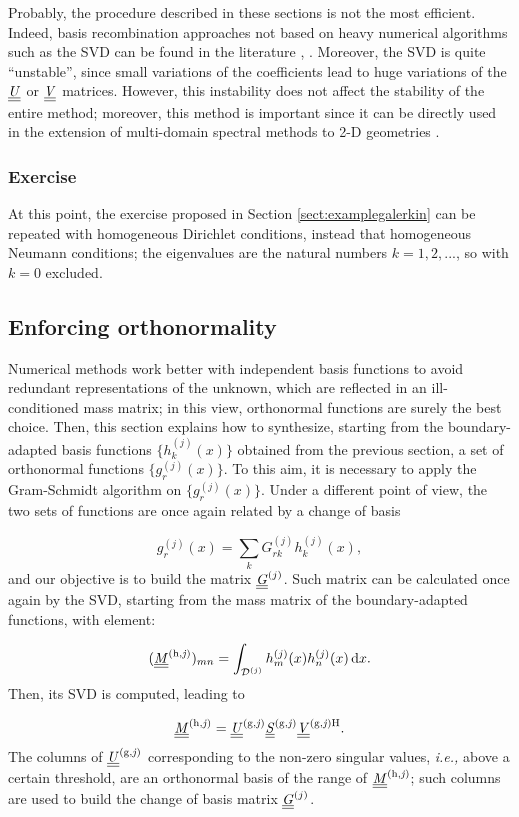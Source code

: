 \documentclass[a4paper,12pt]{article}
\begin{document}
Probably, the procedure described in these sections is not the most efficient. Indeed, basis recombination approaches not based on heavy numerical algorithms such as the SVD can be found in the literature \cite{morf1995}, \cite{bastonero}. Moreover, the SVD is quite ``unstable'', since small variations of the coefficients lead to huge variations of the $\underline{\underline{\mathit{U}}}$ or $\underline{\underline{\mathit{V}}}$ matrices. However, this instability does not affect the stability of the entire method; moreover, this method is important since it can be directly used in the extension of multi-domain spectral methods to 2-D geometries \cite{tibaldiphd}.

\subsubsection{Exercise}

At this point, the exercise proposed in Section \ref{sect:examplegalerkin} can be repeated with homogeneous Dirichlet conditions, instead that homogeneous Neumann conditions; the eigenvalues are the natural numbers $k=1, 2, ...$, so with $k=0$ excluded.

\subsection{Enforcing orthonormality}

Numerical methods work better with independent basis functions to avoid redundant representations of the unknown, which are reflected in an ill-conditioned mass matrix; in this view, orthonormal functions are surely the best choice. Then, this section explains how to synthesize, starting from the boundary-adapted basis functions $\{h_k^{(j)}(x)\}$ obtained from the previous section, a set of orthonormal functions $\{g_r^{(j)}(x)\}$. To this aim, it is necessary to apply the Gram-Schmidt algorithm on $\{g_r^{(j)}(x)\}$. Under a different point of view, the two sets of functions are once again related by a change of basis

\[
g_r^{(j)}(x) = \sum_k G_{rk}^{(j)} h_k^{(j)}(x),
\]
and our objective is to build the matrix $\underline{\underline{\mathit{G}}}^{(j)}$. Such matrix can be calculated once again by the SVD, starting from the mass matrix of the boundary-adapted functions, with element:

\[
(\underline{\underline{\mathit{M}}}^{\mathrm{(h,\mathit{j})}})_{mn} = \int_{\mathcal{D}^{(j)}} h_m^{(j)}(x) h_n^{(j)}(x) \, \mathrm{d} x.
\]
Then, its SVD is computed, leading to

\[
\underline{\underline{\mathit{M}}}^{\mathrm{(h,\mathit{j})}} = \underline{\underline{\mathit{U}}}^{\mathrm{(g,\mathit{j})}} \underline{\underline{\mathit{S}}}^{\mathrm{(g,\mathit{j})}} \underline{\underline{\mathit{V}}}^{\mathrm{(g,\mathit{j})H}}.
\]
The columns of $\underline{\underline{\mathit{U}}}^{\mathrm{(g,\mathit{j})}}$ corresponding to the non-zero singular values, \textit{i.e.,} above a certain threshold, are an orthonormal basis of the range of $\underline{\underline{\mathit{M}}}^{\mathrm{(h,\mathit{j})}}$; such columns are used to build the change of basis matrix $\underline{\underline{\mathit{G}}}^{(j)}$.
\end{document}
